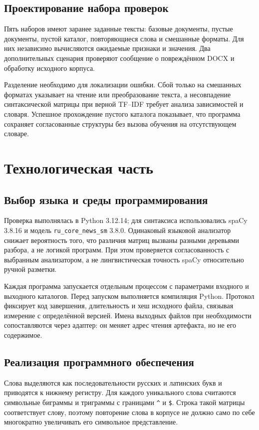 \section{Проектирование набора проверок}
Пять наборов имеют заранее заданные тексты: базовые документы, пустые документы, пустой каталог, повторяющиеся слова и смешанные форматы. Для них независимо вычисляются ожидаемые признаки и значения. Два дополнительных сценария проверяют сообщение о повреждённом DOCX и обработку исходного корпуса.

Разделение необходимо для локализации ошибки. Сбой только на смешанных форматах указывает на чтение или преобразование текста, а несовпадение синтаксической матрицы при верной TF--IDF требует анализа зависимостей и словаря. Успешное прохождение пустого каталога показывает, что программа сохраняет согласованные структуры без вызова обучения на отсутствующем словаре.

\chapter{Технологическая часть}
\section{Выбор языка и среды программирования}
Проверка выполнялась в Python 3.12.14; для синтаксиса использовались spaCy 3.8.16 и модель \texttt{ru\_core\_news\_sm} 3.8.0. Одинаковый языковой анализатор снижает вероятность того, что различия матриц вызваны разными деревьями разбора, а не логикой программ. При этом проверяется согласованность с выбранным анализатором, а не лингвистическая точность spaCy относительно ручной разметки.

Каждая программа запускается отдельным процессом с параметрами входного и выходного каталогов. Перед запуском выполняется компиляция Python. Протокол фиксирует код завершения, длительность и хеш исходного файла, связывая измерение с определённой версией. Имена выходных файлов при необходимости сопоставляются через адаптер: он меняет адрес чтения артефакта, но не его содержимое.

\section{Реализация программного обеспечения}
Слова выделяются как последовательности русских и латинских букв и приводятся к нижнему регистру. Для каждого уникального слова считаются символьные биграммы и триграммы с границами \texttt{\^} и \texttt{\$}. Строка такой матрицы соответствует слову, поэтому повторение слова в корпусе не должно само по себе многократно увеличивать его символьное представление.


